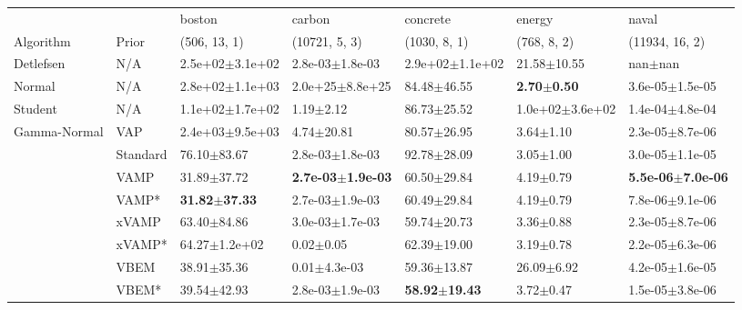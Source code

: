 \begin{tabular}{lllllll}
\toprule
             &       &                    boston &                        carbon &                  concrete &                  energy &                         naval \\
Algorithm & Prior& (506, 13, 1)& (10721, 5, 3)& (1030, 8, 1)& (768, 8, 2)& (11934, 16, 2)\\
\midrule
Detlefsen & N/A &       2.5e+02$\pm$3.1e+02 &           2.8e-03$\pm$1.8e-03 &       2.9e+02$\pm$1.1e+02 &         21.58$\pm$10.55 &                   nan$\pm$nan \\
Normal & N/A &       2.8e+02$\pm$1.1e+03 &           2.0e+25$\pm$8.8e+25 &           84.48$\pm$46.55 &  \textbf{2.70$\pm$0.50} &           3.6e-05$\pm$1.5e-05 \\
Student & N/A &       1.1e+02$\pm$1.7e+02 &                 1.19$\pm$2.12 &           86.73$\pm$25.52 &     1.0e+02$\pm$3.6e+02 &           1.4e-04$\pm$4.8e-04 \\
Gamma-Normal & VAP &       2.4e+03$\pm$9.5e+03 &                4.74$\pm$20.81 &           80.57$\pm$26.95 &           3.64$\pm$1.10 &           2.3e-05$\pm$8.7e-06 \\
             & Standard &           76.10$\pm$83.67 &           2.8e-03$\pm$1.8e-03 &           92.78$\pm$28.09 &           3.05$\pm$1.00 &           3.0e-05$\pm$1.1e-05 \\
             & VAMP &           31.89$\pm$37.72 &  \textbf{2.7e-03$\pm$1.9e-03} &           60.50$\pm$29.84 &           4.19$\pm$0.79 &  \textbf{5.5e-06$\pm$7.0e-06} \\
             & VAMP* &  \textbf{31.82$\pm$37.33} &           2.7e-03$\pm$1.9e-03 &           60.49$\pm$29.84 &           4.19$\pm$0.79 &           7.8e-06$\pm$9.1e-06 \\
             & xVAMP &           63.40$\pm$84.86 &           3.0e-03$\pm$1.7e-03 &           59.74$\pm$20.73 &           3.36$\pm$0.88 &           2.3e-05$\pm$8.7e-06 \\
             & xVAMP* &         64.27$\pm$1.2e+02 &                 0.02$\pm$0.05 &           62.39$\pm$19.00 &           3.19$\pm$0.78 &           2.2e-05$\pm$6.3e-06 \\
             & VBEM &           38.91$\pm$35.36 &              0.01$\pm$4.3e-03 &           59.36$\pm$13.87 &          26.09$\pm$6.92 &           4.2e-05$\pm$1.6e-05 \\
             & VBEM* &           39.54$\pm$42.93 &           2.8e-03$\pm$1.9e-03 &  \textbf{58.92$\pm$19.43} &           3.72$\pm$0.47 &           1.5e-05$\pm$3.8e-06 \\

\end{tabular}
